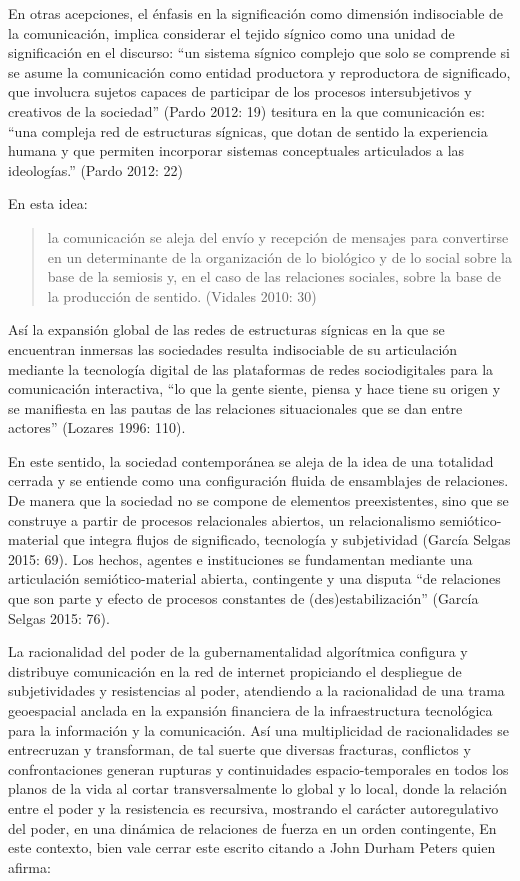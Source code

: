 \documentclass[
]{interact}
\begin{document}
En otras acepciones, el énfasis en la significación como dimensión
indisociable de la comunicación, implica considerar el tejido sígnico
como una unidad de significación en el discurso: ``un sistema sígnico
complejo que solo se comprende si se asume la comunicación como entidad
productora y reproductora de significado, que involucra sujetos capaces
de participar de los procesos intersubjetivos y creativos de la
sociedad'' (Pardo 2012: 19) tesitura en la que comunicación es: ``una
compleja red de estructuras sígnicas, que dotan de sentido la
experiencia humana y que permiten incorporar sistemas conceptuales
articulados a las ideologías.'' (Pardo 2012: 22)

En esta idea:

\begin{quote}
la comunicación se aleja del envío y recepción de mensajes para
convertirse en un determinante de la organización de lo biológico y de
lo social sobre la base de la semiosis y, en el caso de las relaciones
sociales, sobre la base de la producción de sentido. (Vidales 2010: 30)
\end{quote}

Así la expansión global de las redes de estructuras sígnicas en la que
se encuentran inmersas las sociedades resulta indisociable de su
articulación mediante la tecnología digital de las plataformas de redes
sociodigitales para la comunicación interactiva, ``lo que la gente
siente, piensa y hace tiene su origen y se manifiesta en las pautas de
las relaciones situacionales que se dan entre actores'' (Lozares 1996:
110).

En este sentido, la sociedad contemporánea se aleja de la idea de una
totalidad cerrada y se entiende como una configuración fluida de
ensamblajes de relaciones. De manera que la sociedad no se compone de
elementos preexistentes, sino que se construye a partir de procesos
relacionales abiertos, un relacionalismo semiótico-material que integra
flujos de significado, tecnología y subjetividad (García Selgas 2015:
69). Los hechos, agentes e instituciones se fundamentan mediante una
articulación semiótico-material abierta, contingente y una disputa ``de
relaciones que son parte y efecto de procesos constantes de
(des)estabilización'' (García Selgas 2015: 76).

La racionalidad del poder de la gubernamentalidad algorítmica configura
y distribuye comunicación en la red de internet propiciando el
despliegue de subjetividades y resistencias al poder, atendiendo a la
racionalidad de una trama geoespacial anclada en la expansión financiera
de la infraestructura tecnológica para la información y la comunicación.
Así una multiplicidad de racionalidades se entrecruzan y transforman, de
tal suerte que diversas fracturas, conflictos y confrontaciones generan
rupturas y continuidades espacio-temporales en todos los planos de la
vida al cortar transversalmente lo global y lo local, donde la relación
entre el poder y la resistencia es recursiva, mostrando el carácter
autoregulativo del poder, en una dinámica de relaciones de fuerza en un
orden contingente, En este contexto, bien vale cerrar este escrito
citando a John Durham Peters quien afirma:
\end{document}
